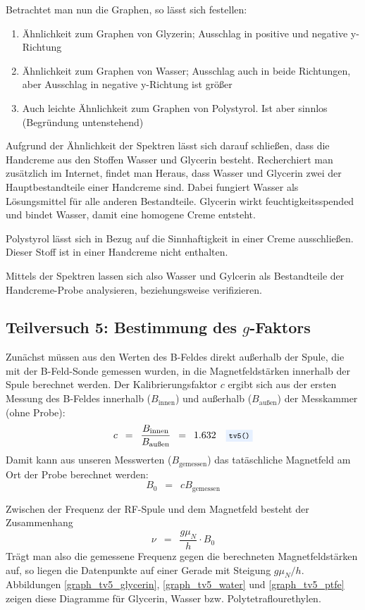 \documentclass{article}
\newcommand{\widespace}{\enspace}
\newcommand{\wideeq}{\widespace = \widespace}
\newcommand{\coderef}[1]{%
    \text{\footnotesize \colorbox{codebg}{\texttt{#1()}}}%
}
\begin{document}
Betrachtet man nun die Graphen, so lässt sich festellen:
\begin{enumerate}
    \item Ähnlichkeit zum Graphen von Glyzerin; Ausschlag in positive und negative y-Richtung
    \item Ähnlichkeit zum Graphen von Wasser; Ausschlag auch in beide Richtungen, aber Ausschlag in negative y-Richtung ist größer
    \item Auch leichte Ähnlichkeit zum Graphen von Polystyrol. Ist aber sinnlos (Begründung untenstehend)
\end{enumerate}

Aufgrund der Ähnlichkeit der Spektren lässt sich darauf schließen, dass die Handcreme aus den Stoffen Wasser und Glycerin besteht. Recherchiert man zusätzlich im Internet, findet man Heraus, dass Wasser und Glycerin zwei der Hauptbestandteile einer Handcreme sind. Dabei fungiert Wasser als Lösungsmittel für alle anderen Bestandteile. Glycerin wirkt feuchtigkeitsspended und bindet Wasser, damit eine homogene Creme entsteht.

Polystyrol lässt sich in Bezug auf die Sinnhaftigkeit in einer Creme ausschließen. Dieser Stoff ist in einer Handcreme nicht enthalten.

Mittels der Spektren lassen sich also Wasser und Gylcerin als Bestandteile der Handcreme-Probe analysieren, beziehungsweise verifizieren.

\cite{cc}

\newpage

\subsection{Teilversuch 5: Bestimmung des $g$-Faktors}

Zunächst müssen aus den Werten des B-Feldes direkt außerhalb der Spule, die mit der
B-Feld-Sonde gemessen wurden, in die Magnetfeldstärken innerhalb der Spule berechnet
werden. Der Kalibrierungsfaktor $c$ ergibt sich aus der ersten Messung des B-Feldes
innerhalb ($B_\text{innen}$) und außerhalb ($B_\text{außen}$)
der Messkammer (ohne Probe):
\[
    c \wideeq \frac{B_\text{innen}}{B_\text{außen}} \wideeq \num{1.632}
    \quad \coderef{tv5}
\]
Damit kann aus unseren Messwerten ($B_\text{gemessen}$) das tatäschliche
Magnetfeld am Ort der Probe berechnet werden:
\[
    B_0 \wideeq c B_\text{gemessen}
\]

Zwischen der Frequenz der RF-Spule und dem Magnetfeld besteht der Zusammenhang
\[
    \nu \wideeq \frac{g \mu_N}{h} \cdot B_0
\]
Trägt man also die gemessene Frequenz gegen die berechneten Magnetfeldstärken
auf, so liegen die Datenpunkte auf einer Gerade mit Steigung $g \mu_N / h$.
Abbildungen \ref{graph_tv5_glycerin}, \ref{graph_tv5_water} und \ref{graph_tv5_ptfe}
zeigen diese Diagramme für Glycerin, Wasser bzw. Polytetraflourethylen.
\end{document}
